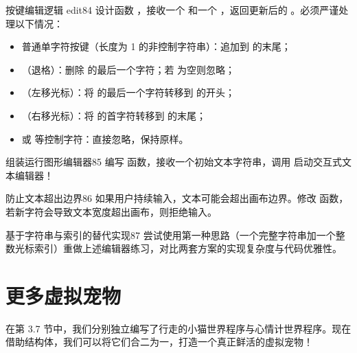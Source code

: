 \begin{exercise}{按键编辑逻辑 edit}{84}
设计函数 ，接收一个  和一个 ，返回更新后的 。必须严谨处理以下情况：
\begin{itemize}
  \item 普通单字符按键（长度为 1 的非控制字符串）：追加到  的末尾；
  \item {}（退格）：删除  的最后一个字符；若  为空则忽略；
  \item {}（左移光标）：将  的最后一个字符转移到  的开头；
  \item {}（右移光标）：将  的首字符转移到  的末尾；
  \item {} 或  等控制字符：直接忽略，保持原样。
\end{itemize}
\end{exercise}

\begin{exercise}{组装运行图形编辑器}{85}
编写  函数，接收一个初始文本字符串，调用  启动交互式文本编辑器！
\end{exercise}

\begin{exercise}{防止文本超出边界}{86}
如果用户持续输入，文本可能会超出画布边界。修改  函数，若新字符会导致文本宽度超出画布，则拒绝输入。
\end{exercise}

\begin{exercise}{基于字符串与索引的替代实现}{87}
尝试使用第一种思路（一个完整字符串加一个整数光标索引）重做上述编辑器练习，对比两套方案的实现复杂度与代码优雅性。
\end{exercise}

\section{更多虚拟宠物}
\label{sec:5.11_more_virtual_pets}

在第 3.7 节中，我们分别独立编写了行走的小猫世界程序与心情计世界程序。现在借助结构体，我们可以将它们合二为一，打造一个真正鲜活的虚拟宠物！

